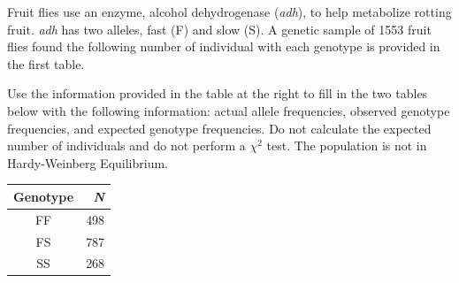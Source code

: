 
\question[15]
Fruit flies use an enzyme, alcohol dehydrogenase (\emph{adh}), to help metabolize rotting fruit. \emph{adh} has two alleles, fast (F) and slow (S).  A genetic sample of 1553 fruit flies found the following number of individual with each genotype is provided in the first table.

\vspace{\baselineskip}

\begin{minipage}{0.6\linewidth}
Use the information provided in the table at the right to fill in the two tables below with the following information: actual allele frequencies, observed genotype frequencies, and expected genotype frequencies.  Do not calculate the expected number of individuals and do not perform a $\chi^2$ test. The population is not in Hardy-Weinberg Equilibrium.
\end{minipage}\hfill
\begin{minipage}{0.3\linewidth}
	\begin{tabular}{cr}
	\toprule
	Genotype	&	\emph{N}\\
	\midrule
	FF	&	498\\
	FS	&	787\\
	SS	&	268\\
	\bottomrule
	\end{tabular}\vfill
\end{minipage}

\vspace{\baselineskip}

